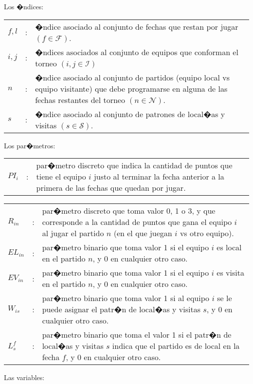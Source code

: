 \documentclass[authoryear,preprint,review,12pt]{elsarticle}
\begin{document}
\vspace{0.05in} Los �ndices:

\begin{tabular}{p{0.79cm}cp{13.5cm}}
$f,l$   & : & �ndice asociado al conjunto de fechas que restan por jugar $(f \in \mathcal{F})$.\\
$i,j$   & : & �ndices asociados al conjunto de equipos que conforman el torneo $(i,j \in \mathcal{I})$\\
$n$     & : & �ndice asociado al conjunto de partidos (equipo local vs equipo visitante) que debe programarse en alguna de las fechas restantes del torneo $(n \in \mathcal{N})$.\\
$s$     & : & �ndice asociado al conjunto de patrones de local�as y visitas $(s \in \mathcal{S})$.
\end{tabular}

\vspace{0.05in} Los par�metros:

\begin{tabular}{p{0.79cm}cp{13.5cm}}
$PI_i$    & : & par�metro discreto que indica la cantidad de puntos que tiene el equipo $i$ justo al terminar la fecha anterior a la primera de las fechas que quedan por jugar.\\
\end{tabular}
\begin{tabular}{p{0.79cm}cp{13.5cm}}
$R_{in}$    & : & par�metro discreto que toma valor 0, 1 o 3, y que corresponde a la cantidad de puntos que gana el equipo $i$ al jugar el partido $n$ (en el que juegan $i$ vs otro equipo).\\
$EL_{in}$   & : & par�metro binario que toma valor 1 si el equipo $i$ es local en el partido $n$, y 0 en cualquier otro caso.\\
$EV_{in}$   & : & par�metro binario que toma valor 1 si el equipo $i$ es visita en el partido $n$, y 0 en cualquier otro caso.\\
$W_{is}$    & : & par�metro binario que toma valor 1 si al equipo $i$ se le puede asignar el patr�n de local�as y visitas $s$, y 0 en cualquier otro caso.\\
$L_{s}^f$   & : & par�metro binario que toma el valor 1 si el patr�n de local�as y visitas $s$ indica que el partido es de local en la fecha $f$, y 0 en cualquier otro caso.
\end{tabular}

\vspace{0.05in}

Las variables:
\end{document}
